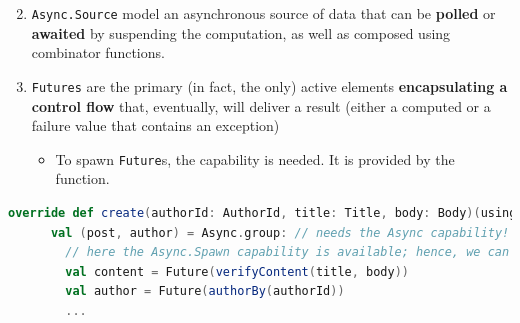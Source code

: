 \documentclass[aspectratio=1610,xcolor=dvipsnames,handout]{beamer}
\begin{document}
\begin{frame}[fragile]
  \begin{block}{}
    \begin{enumerate}
      \setcounter{enumi}{1}
      \item \texttt{Async.Source} model an asynchronous source of data that can be \textbf{polled} or \textbf{awaited} by suspending the computation, as well as composed using combinator functions.
      \item \texttt{Futures} are the primary (in fact, the only) active elements \textbf{encapsulating a control flow} that, eventually, will deliver a result (either a computed or a failure value that contains an exception)
      \begin{itemize}
        \item To spawn \texttt{Future}s, the  capability is needed. It is provided by the  function.
      \end{itemize}
    \end{enumerate}
  \end{block}
  \pause
  \begin{lstlisting}[language=scala,gobble=4]
    override def create(authorId: AuthorId, title: Title, body: Body)(using Async, CanFail): Post =
      val (post, author) = Async.group: // needs the Async capability!
        // here the Async.Spawn capability is available; hence, we can spawn Futures
        val content = Future(verifyContent(title, body))
        val author = Future(authorBy(authorId))
        ...
  \end{lstlisting}
\end{frame}
%
\end{document}
